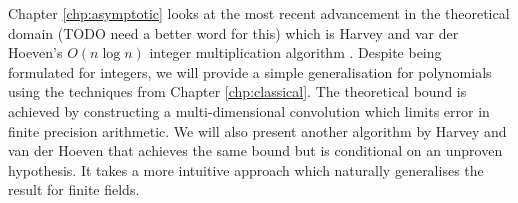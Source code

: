 Chapter \ref{chp:asymptotic} looks at the most recent advancement in the theoretical domain (TODO need a better word for this) which is Harvey and var der Hoeven's $O(n \log n)$ integer multiplication algorithm \cite{nlogn}. Despite being formulated for integers, we will provide a simple generalisation for polynomials using the techniques from Chapter \ref{chp:classical}. The theoretical bound is achieved by constructing a multi-dimensional convolution which limits error in finite precision arithmetic. We will also present another algorithm by Harvey and van der Hoeven that achieves the same bound but is conditional on an unproven hypothesis. It takes a more intuitive approach which naturally generalises the result for finite fields.
